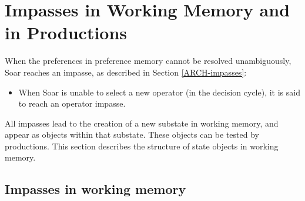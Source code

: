 


\section{Impasses in Working Memory and in Productions}
\label{SYNTAX-impasses}

When the preferences in preference memory cannot be resolved unambiguously,
Soar reaches an impasse, as described in Section \ref{ARCH-impasses}:
\vspace{-12pt}
\begin{itemize}
\item When Soar is unable to select a new operator (in the decision cycle), it
        is said to reach an operator impasse.
\end{itemize}\vspace{-8pt}

All impasses lead to the creation of a new substate in working memory, and appear 
as objects within that substate. These objects can be tested by productions.
This section describes the structure of state objects in working memory.

\subsection{Impasses in working memory}
\label{SYNTAX-impasseaug}       %

